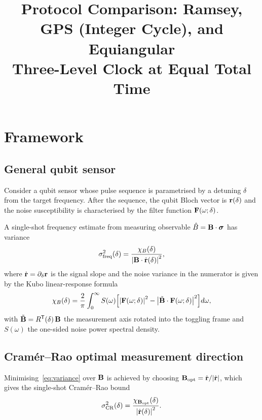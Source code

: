 \documentclass[12pt]{article}
\title{Protocol Comparison: Ramsey, GPS (Integer Cycle), and Equiangular\\
       Three-Level Clock at Equal Total Time}
\author{}
\date{}
\newcommand{\chivar}{\chi}       %
\begin{document}
\maketitle

\section*{Framework}

\subsection*{General qubit sensor}

Consider a qubit sensor whose pulse sequence is parametrised by a detuning
$\delta$ from the target frequency.
After the sequence, the qubit Bloch vector is $\vb{r}(\delta)$ and the noise
susceptibility is characterised by the filter function $\vb{F}(\omega;\delta)$.

A single-shot frequency estimate from measuring observable
$\hat{B} = \vb{B}\cdot\boldsymbol{\sigma}$ has variance
\begin{equation}\label{eq:variance}
    \sigma^2_{\rm freq}(\delta)
    = \frac{\chivar_B(\delta)}{\abs{\vb{B}\cdot\dot{\vb{r}}(\delta)}^2},
\end{equation}
where $\dot{\vb{r}} = \partial_\delta\vb{r}$ is the signal slope and the
noise variance in the numerator is given by the Kubo linear-response formula
\begin{equation}\label{eq:chi}
    \chivar_B(\delta)
    = \frac{2}{\pi}\int_0^\infty S(\omega)
      \Bigl[\abs{\vb{F}(\omega;\delta)}^2
            - \abs{\tilde{\vb{B}}\cdot\vb{F}(\omega;\delta)}^2\Bigr]d\omega,
\end{equation}
with $\tilde{\vb{B}} = R^{\mathsf{T}}(\delta)\,\vb{B}$ the measurement axis
rotated into the toggling frame and $S(\omega)$ the one-sided noise power
spectral density.

\subsection*{Cramér--Rao optimal measurement direction}

Minimising~\eqref{eq:variance} over $\vb{B}$ is achieved by choosing
$\vb{B}_{\rm opt} = \dot{\vb{r}}/\abs{\dot{\vb{r}}}$, which gives the
single-shot Cramér--Rao bound
\begin{equation}\label{eq:cr-variance}
    \sigma^2_{\rm CR}(\delta)
    = \frac{\chivar_{\vb{B}_{\rm opt}}(\delta)}{\abs{\dot{\vb{r}}(\delta)}^2}.
\end{equation}
\end{document}
